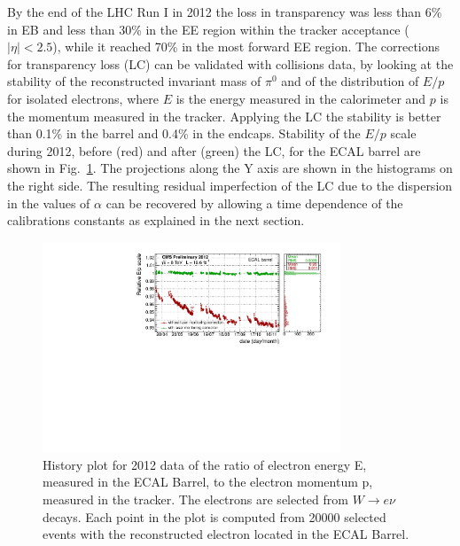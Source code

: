 \documentclass[journal]{IEEEtran}
\begin{document}
By the end of the LHC Run I in 2012 the loss in transparency was less than 6\% in EB and less than 30\% in the EE region within the tracker acceptance ($\vert\eta\vert<2.5$), while it reached 70\% in the most forward EE region. The corrections for transparency loss (LC) can be validated with collisions data, by looking at the stability of the reconstructed invariant mass of $\pi^0$ and of the distribution of $E/p$ for isolated electrons, where $E$ is the energy measured in the calorimeter and $p$ is the momentum measured in the tracker. Applying the LC the stability is better than 0.1\% in the barrel and 0.4\% in the endcaps.  Stability of the $E/p$ scale during 2012, before (red) and after (green) the LC, for the ECAL barrel are shown in Fig.~\ref{fig:EoP_2012}. The projections along the Y axis are shown in the histograms on the right side.
 The resulting residual imperfection of the LC due to the dispersion in the values of $\alpha$ can be recovered by allowing a time dependence of the calibrations constants as explained in the next section. 
%
\begin{figure}[!t]
  \begin{center}
    \includegraphics[width=3.5in]{EoP_EB_Winter2013}
    \caption{History plot for 2012 data of the ratio of electron energy E, measured in the ECAL Barrel, to the electron momentum p, measured in the tracker.  The electrons are selected from $W\to e\nu$ decays. Each point in the plot is computed from 20000 selected events with the reconstructed electron located in the ECAL Barrel. \label{fig:EoP_2012}}
  \end{center}
\end{figure}
\end{document}

